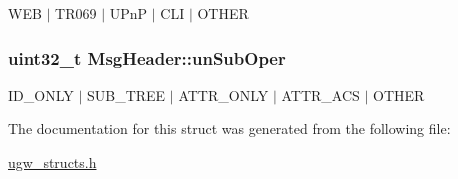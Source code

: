 W\-E\-B $\vert$ T\-R069 $\vert$ U\-Pn\-P $\vert$ C\-L\-I $\vert$ O\-T\-H\-E\-R \hypertarget{structMsgHeader_a23764d626c84a4f847c356e9a0c154ed}{
\subsubsection[{un\-Sub\-Oper}]{\setlength{\rightskip}{0pt plus 5cm}uint32\-\_\-t Msg\-Header\-::un\-Sub\-Oper}}\label{structMsgHeader_a23764d626c84a4f847c356e9a0c154ed}
I\-D\-\_\-\-O\-N\-L\-Y $\vert$ S\-U\-B\-\_\-\-T\-R\-E\-E $\vert$ A\-T\-T\-R\-\_\-\-O\-N\-L\-Y $\vert$ A\-T\-T\-R\-\_\-\-A\-C\-S $\vert$ O\-T\-H\-E\-R 

The documentation for this struct was generated from the following file\-:\begin{DoxyCompactItemize}
\item 
\hyperlink{ugw__structs_8h}{ugw\-\_\-structs.\-h}\end{DoxyCompactItemize}
